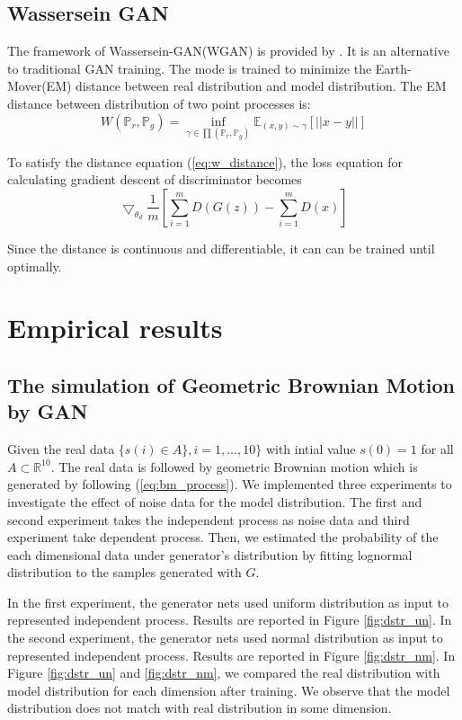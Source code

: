 \documentclass{article}
\begin{document}
	\subsection{Wassersein GAN}
	The framework of Wassersein-GAN(WGAN) is provided by \cite{arjovsky}. 
	It is an alternative to traditional GAN training.
	The mode is trained to minimize the Earth-Mover(EM) distance between real distribution and model distribution.
	The EM distance between distribution of two point processes is:
	\begin{equation}
		W(\mathbb{P}_r, \mathbb{P}_g) = \inf_{\gamma \in \prod(\mathbb{P}_r, \mathbb{P}_g)} \mathbb{E}_{(x,y)\sim \gamma}\left[||x-y||\right]
		\label{eq:w_distance}
	\end{equation}
	
	To satisfy the distance equation (\ref{eq:w_distance}), the loss equation for calculating gradient descent of discriminator becomes
	\begin{equation}
	\bigtriangledown_{\theta_d} \frac{1}{m}\left[\sum_{i=1}^{m}D(G(z)) - \sum_{i=1}^{m}D(x) \right]
	\end{equation}
	
	Since the distance is continuous and differentiable, it can can be trained until optimally. 
	
	
	
	\section{Empirical results}
	\subsection{The simulation of Geometric Brownian Motion by GAN}
	
	Given the real data $\{ s(i)\in A \}, i = 1, \dots, 10\}$ with intial  value $s(0)=1$ for all $A \subset \mathbb{R}^{10}$.
	The real data is followed by geometric Brownian motion which is generated by following (\ref{eq:bm_process}).
	 We implemented three experiments to investigate the effect of noise data for the model distribution.
	The first and second experiment takes the independent process as noise data and third experiment take dependent process.
	Then, we estimated the probability of the each dimensional data under generator’s distribution by fitting lognormal distribution to the samples generated with $G$. 
	
	
	In the first experiment, the generator nets used uniform distribution as input to represented independent process.
	Results are reported in Figure \ref{fig:dstr_un}. 
	In the second experiment, the generator nets used normal distribution as input to represented independent process.
	Results are reported in Figure \ref{fig:dstr_nm}. 
	In Figure \ref{fig:dstr_un} and \ref{fig:dstr_nm}, we compared the real distribution with model distribution for each dimension after training. 
	We observe that the model distribution does not match with real distribution in some dimension. 
	
\end{document}
